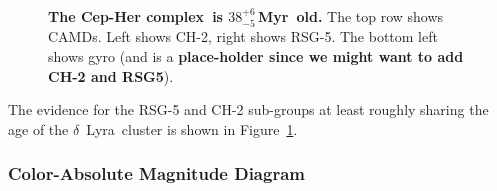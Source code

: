 \documentclass[12pt,twocolumn,linenumbers]{aastex63}
\newcommand{\cn}{Cep-Her complex} %
\newcommand{\clusterage}{$38^{+6}_{-5}$\,Myr} %
\begin{document}
\begin{figure}[tp]
\begin{center}
		\vspace{-0.6cm}
	\end{center}
	\vspace{-0.7cm}
	\caption{
		{\bf The \cn\ is \clusterage\ old.} 
    The top row shows CAMDs.  Left shows CH-2, right shows RSG-5.  The
    bottom left shows gyro (and is a {\bf place-holder since we might
    want to add CH-2 and RSG5}).  
		\label{fig:age}
	}
\end{figure}


The evidence for the RSG-5 and CH-2 sub-groups at least roughly
sharing the age of the $\delta$\ Lyra\ cluster is shown in
Figure~\ref{fig:age}.

\subsubsection{Color-Absolute Magnitude Diagram}
\label{sec:camd}
\end{document}
